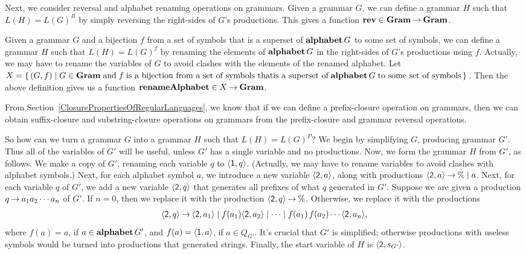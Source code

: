 Next, we consider reversal and alphabet renaming operations on
grammars.  Given a grammar $G$, we can define a grammar $H$ such that
%
%
$L(H)=L(G)^R$ by simply reversing the right-sides of $G$'s
productions.
This gives a function $\mathbf{rev}\in\mathbf{Gram}\mathbin{\to}\mathbf{Gram}$.
%

Given a grammar $G$ and a bijection $f$ from a set of symbols that is
a superset of $\mathbf{alphabet}\,G$ to some set of symbols, we can define a
grammar $H$ such that $L(H)=L(G)^f$ by renaming the elements of
%
%
%
$\mathbf{alphabet}\,G$ in the right-sides of $G$'s productions using $f$.
Actually, we may have to rename the variables of $G$ to avoid clashes
with the elements of the renamed alphabet.  Let
$X=\{ \, (G,f) \mid G\in\mathbf{Gram}\;\allowbreak\mbox{and}\allowbreak\;f\;\allowbreak\mbox{is a bijection from a
    set of symbols that}\allowbreak\allowbreak\mbox{is a superset
    of}\allowbreak\;\mathbf{alphabet}\,G\;\allowbreak\mbox{to some set of symbols}\allowbreak \, \}$.  Then the above
definition gives us a function
$\mathbf{renameAlphabet}\in X\mathbin{\to}\mathbf{Gram}$.
%

From Section~\ref{ClosurePropertiesOfRegularLanguages},
we know that if we can define a prefix-closure operation
%
%
%
%
%
%
%
%
%
on grammars, then we can obtain suffix-closure and substring-closure
operations on grammars from the prefix-closure and grammar reversal
operations.

So how can we turn a grammar $G$ into a grammar $H$ such that
$L(H)=L(G)^P$?
We begin by simplifying $G$, producing grammar $G'$.
Thus all of the variables of $G'$ will be useful, unless $G'$ has
a single variable and no productions.  Now, we form the grammar $H$
from $G'$, as follows.
We make a copy of $G'$, renaming each variable $q$ to
$\langle\mathsf{1},q\rangle$.  (Actually, we may have to rename variables
to avoid clashes with alphabet symbols.)
Next, for each alphabet symbol $a$, we introduce a new variable
$\langle\mathsf{2},a\rangle$, along with productions
$\langle\mathsf{2},a\rangle\mathbin{\to}\%\mid a$.
Next, for each variable $q$ of $G'$, we add a new variable
$\langle\mathsf{2},q\rangle$ that generates all prefixes of what $q$
generated in $G'$.  Suppose we are given a production $q\mathbin{\to}
a_1a_2\cdots a_n$ of $G'$.  If $n=0$, then we replace it with the
production $\langle\mathsf{2},q\rangle\mathbin{\to}\%$.  Otherwise, we replace it
with the productions
\begin{gather*}
\langle\mathsf{2},q\rangle\mathbin{\to}
\langle\mathsf{2},a_1\rangle \mid
f(a_1)\langle\mathsf{2},a_2\rangle \mid \cdots \mid
f(a_1)\,f(a_2)\cdots\langle\mathsf{2},a_n\rangle ,
\end{gather*}
where $f(a) = a$, if $a\in\mathbf{alphabet}\,G'$, and
$f(a)=\langle\mathsf{1},a\rangle$, if $a\in Q_{G'}$.  It's crucial that
$G'$ is simplified; otherwise productions with useless symbols would
be turned into productions that generated strings. Finally, the start
variable of $H$ is $\langle\mathsf{2},s_{G'}\rangle$.

